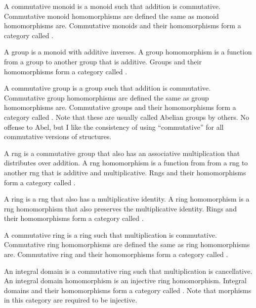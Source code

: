 \documentclass[../math.tex]{subfiles}
\begin{document}
\begin{definition}
    A commutative monoid is a monoid such that addition is commutative.
    Commutative monoid homomorphisms are defined the same as monoid
    homomorphisms are.  Commutative monoids and their homomorphisms form a
    category called .
\end{definition}

\begin{definition}
    A group is a monoid with additive inverses.  A group homomorphism is a
    function from a group to another group that is additive.  Groups and their
    homomorphisms form a category called .
\end{definition}

\begin{definition}
    A commutative group is a group such that addition is commutative.
    Commutative group homomorphisms are defined the same as group homomorphisms
    are.  Commutative groups and their homomorphisms form a category called
    .  Note that these are usually called Abelian groups by others.
    No offense to Abel, but I like the consistency of using ``commutative'' for
    all commutative versions of structures.
\end{definition}

\begin{definition}
    A rng is a commutative group that also has an associative multiplication
    that distributes over addition.  A rng homomorphism is a function from from
    a rng to another rng that is additive and multiplicative.  Rngs and their
    homomorphisms form a category called .
\end{definition}

\begin{definition}
    A ring is a rng that also has a multiplicative identity.  A ring
    homomorphism is a rng homomorphism that also preserves the multiplicative
    identity.  Rings and their homomorphisms form a category called .
\end{definition}

\begin{definition}
    A commutative ring is a ring such that multiplication is commutative.
    Commutative ring homomorphisms are defined the same as ring homomorphisms
    are.  Commutative ring and their homomorphisms form a category called
    .
\end{definition}

\begin{definition}
    An integral domain is a commutative ring such that multiplication is
    cancellative.  An integral domain homomorphism is an injective ring
    homomorphism.  Integral domains and their homomorphisms form a category
    called .  Note that morphisms in this category are required to
    be injective.
\end{definition}
\end{document}
